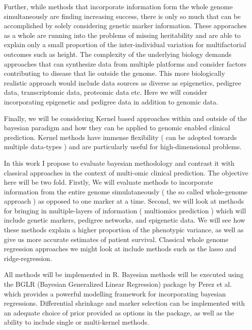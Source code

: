 \documentclass{sig-alternate-05-2015}
\begin{document}
Further, while methods that incorporate information form the whole genome simultaneously are finding increasing success, there is only so much that can be accomplished by solely considering genetic marker information.
These apporaches as a whole are running into the problems of missing heritability and are able to explain only a small proportion of the inter-individual variation for multifactorial outcomes such as height.\cite{eichler_missing_2010}
The complexity of the underlying biology demands approaches that can synthesize data from multiple platforms and consider factors contributing to disease that lie outside the genome. This more biologically realistic approach
would include data sources as diverse as epigenetics, pedigree data, transcriptomic data,  proteomic data etc.\cite{kim_multi-omics_2016} Here we will consider incorporating epigenetic and pedigree data in addition to genomic data.

Finally, we will be considering Kernel based approaches within and outside of the bayesian paradigm
and how they can be applied to genomic enabled clinical prediction. Kernel methods have immense flexibility ( can be adopted towards multiple data-types ) and are particularly useful for high-dimensional problems.\cite{wang_kernel_2015}

In this work I propose to evaluate bayesian methodology and contrast it with classical approaches in the context of multi-omic clinical prediction. The objective here will be two fold.
Firstly, We will evaluate methods to incorporate information from the entire genome simulataneously ( the so called whole-genome approach ) as opposed to one marker at a time. Second, we will look at methods
for bringing in multiple-layers of information ( multiomics prediction ) which will include genetic markers, pedigree networks, and epigenetic data. We will see how these methods explain a higher proportion of the
phenotypic variance, as well as give us more accurate estimates of patient survival. Classical whole genome regression approaches we might look at include methods such as the lasso and
ridge-regression.\cite{waldmann_evaluation_2013}

All methods will be implemented in R. Bayesian methods will be executed using the BGLR (Bayesian Generalized Linear Regression) package by Perez et al.\cite{perez_genome-wide_2014} which provides a powerful modelling framework for incorporating bayesian regressions.
Differential shrinkage and marker selection can be implemented with an adequate choice of prior provided as options in the package, as well as the ability to include single or multi-kernel methods.
\end{document}
